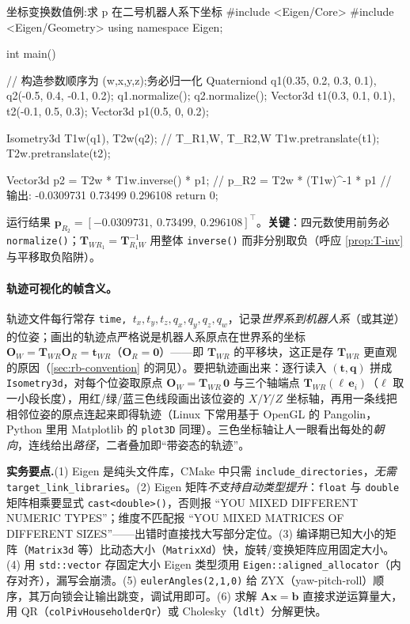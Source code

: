 \begin{codebox}[C++]{坐标变换数值例:求 p 在二号机器人系下坐标}
#include <Eigen/Core>
#include <Eigen/Geometry>
using namespace Eigen;

int main() {
    // 构造参数顺序为 (w,x,y,z);务必归一化
    Quaterniond q1(0.35, 0.2, 0.3, 0.1), q2(-0.5, 0.4, -0.1, 0.2);
    q1.normalize();
    q2.normalize();
    Vector3d t1(0.3, 0.1, 0.1), t2(-0.1, 0.5, 0.3);
    Vector3d p1(0.5, 0, 0.2);

    Isometry3d T1w(q1), T2w(q2);   // T_{R1,W}, T_{R2,W}
    T1w.pretranslate(t1);
    T2w.pretranslate(t2);

    Vector3d p2 = T2w * T1w.inverse() * p1;   // p_{R2} = T2w * (T1w)^-1 * p1
    // 输出: -0.0309731  0.73499  0.296108
    return 0;
}
\end{codebox}
\noindent 运行结果 $\mathbf{p}_{R_2}=[-0.0309731,\ 0.73499,\ 0.296108]^\top$。\textbf{关键}：四元数使用前务必 \texttt{normalize()}；$\mathbf{T}_{WR_1}=\mathbf{T}_{R_1W}^{-1}$ 用整体 \texttt{inverse()} 而非分别取负（呼应 \cref{prop:T-inv} 与平移取负陷阱）。

\paragraph{轨迹可视化的帧含义。}轨迹文件每行常存 \texttt{time, $t_x,t_y,t_z,q_x,q_y,q_z,q_w$}，记录\emph{世界系到机器人系}（或其逆）的位姿；画出的轨迹点严格说是机器人系原点在世界系的坐标 $\mathbf{O}_W=\mathbf{T}_{WR}\mathbf{O}_R=\mathbf{t}_{WR}$（$\mathbf{O}_R=\mathbf{0}$）——即 $\mathbf{T}_{WR}$ 的平移块，这正是存 $\mathbf{T}_{WR}$ 更直观的原因（\cref{sec:rb-convention} 的洞见）。要把轨迹画出来：逐行读入 $(\mathbf{t},\mathbf{q})$ 拼成 \texttt{Isometry3d}，对每个位姿取原点 $\mathbf{O}_W=\mathbf{T}_{WR}\,\mathbf{0}$ 与三个轴端点 $\mathbf{T}_{WR}(\ell\,\mathbf{e}_i)$（$\ell$ 取一小段长度），用红/绿/蓝三色线段画出该位姿的 $X/Y/Z$ 坐标轴，再用一条线把相邻位姿的原点连起来即得轨迹（Linux 下常用基于 OpenGL 的 Pangolin，Python 里用 Matplotlib 的 \texttt{plot3D} 同理）\cite{gaoxiang2019slam14}。三色坐标轴让人一眼看出每处的\emph{朝向}，连线给出\emph{路径}，二者叠加即“带姿态的轨迹”。

\begin{note}
\textbf{实务要点.}\;(1) Eigen 是纯头文件库，CMake 中只需 \texttt{include\_directories}，\emph{无需} \texttt{target\_link\_libraries}。(2) Eigen 矩阵\emph{不支持自动类型提升}：\texttt{float} 与 \texttt{double} 矩阵相乘要显式 \texttt{cast<double>()}，否则报 “YOU MIXED DIFFERENT NUMERIC TYPES”；维度不匹配报 “YOU MIXED MATRICES OF DIFFERENT SIZES”——出错时直接找大写部分定位。(3) 编译期已知大小的矩阵（\texttt{Matrix3d} 等）比动态大小（\texttt{MatrixXd}）快，旋转/变换矩阵应用固定大小。(4) 用 \texttt{std::vector} 存固定大小 Eigen 类型须用 \texttt{Eigen::aligned\_allocator}（内存对齐），漏写会崩溃。(5) \texttt{eulerAngles(2,1,0)} 给 ZYX（yaw-pitch-roll）顺序，其万向锁会让输出跳变，调试用即可。(6) 求解 $\mathbf{A}\mathbf{x}=\mathbf{b}$ 直接求逆运算量大，用 QR（\texttt{colPivHouseholderQr}）或 Cholesky（\texttt{ldlt}）分解更快。
\end{note}

